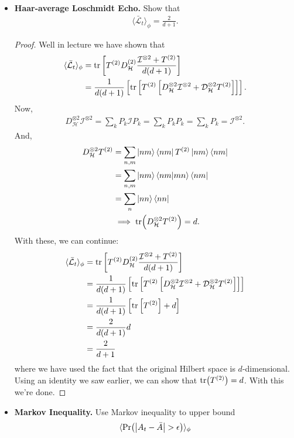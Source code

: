 \documentclass{book}
\theoremstyle{definition}
\newcommand{\lag}{\mathcal{L}}
\newcommand{\nn}{\nonumber}
\newcommand{\had}{\mathcal{H}}
\newcommand{\f}[2]{\frac{#1}{#2}}
\newcommand{\lb}{\left[}
\newcommand{\rb}{\right]}
\newcommand{\la}{\langle}
\newcommand{\ra}{\rangle}
\newcommand{\Id}{\mathcal{I}}
\newcommand{\D}{\mathcal{D}}
\begin{document}
\begin{itemize}
	\item \textbf{Haar-average Loschmidt Echo.} Show that
	\begin{align}
	\langle \bar{\lag}_t \rangle_\phi = \f{2}{d+1}.
	\end{align}
	
	
	\begin{proof}
		Well in lecture we have shown that
		\begin{align}
		\la \bar{\lag}_t \ra_\phi 
		&= \tr\lb T^{(2)} D_\had^{(2)} \f{\Id^{\otimes 2} + T^{(2)} }{d(d+1)} \rb \nn\\
		&= \f{1}{d(d+1)}\lb \tr\lb T^{(2)} \lb D_\had^{\otimes 2} \Id^{\otimes 2} + \D_\had^{\otimes 2} T^{(2)}  \rb \rb \rb.
		\end{align}
		Now, 
		\begin{align}
		D_\had^{\otimes 2} \Id^{\otimes 2} = \sum_{k}P_k \Id P_k = \sum_k P_kP_k = \sum_k P_k = \Id^{\otimes 2}. 
		\end{align}
		And,
		\begin{align}
		D_\had^{\otimes 2}T^{(2)} &= \sum_{n,m} \ket{nm}\bra{nm} T^{(2)} \ket{nm}\bra{nm}\nn\\
		&= \sum_{n,m} \ket{nm}\braket{nm}{mn}\bra{nm}\nn\\
		&= \sum_{n} \ket{nn}\bra{nn} \nn\\
		&\implies \tr (D_\had^{\otimes 2} T^{(2)}) = d. 
		\end{align}
		With these, we can continue:
		\begin{align}
		\la \bar{\lag}_t \ra_\phi 
		&= \tr\lb T^{(2)} D_\had^{(2)} \f{\Id^{\otimes 2} + T^{(2)} }{d(d+1)} \rb \nn\\
		&= \f{1}{d(d+1)}\lb \tr\lb T^{(2)} \lb D_\had^{\otimes 2} \Id^{\otimes 2} + \D_\had^{\otimes 2} T^{(2)}  \rb \rb \rb\nn\\
		&= \f{1}{d(d+1)}\lb \tr\lb T^{( 2)} \rb + d \rb\nn\\
		&= \f{2}{d(d+1)}d \nn\\
		&= \f{2}{d+1}
		\end{align}
		where we have used the fact that the original Hilbert space is $d$-dimensional. Using an identity we saw earlier, we can show that $\tr(T^{(2)}) = d$. With this we're done. 
	\end{proof}
	
	
	\item \textbf{Markov Inequality.} Use Markov inequality to upper bound
	\begin{align}
	\langle \Pr(\abs{A_t - \bar{A}} > \epsilon)\rangle_\phi
	\end{align}
	

\end{itemize}
\end{document}
